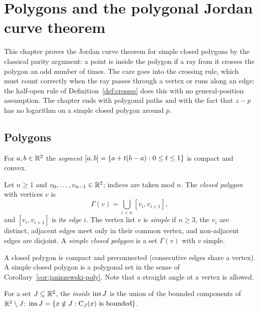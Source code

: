 \chapter{Polygons and the polygonal Jordan curve theorem}\label{ch:poly}

This chapter proves the Jordan curve theorem for simple closed polygons by the classical parity
argument: a point is inside the polygon if a ray from it crosses the polygon an odd number of times.
The care goes into the crossing rule, which must count correctly when the ray passes through a
vertex or runs along an edge; the half-open rule of Definition~\ref{def:crosses} does this with no
general-position assumption. The chapter ends with polygonal paths and with the fact that $z-p$ has
no logarithm on a simple closed polygon around $p$.

\section{Polygons}

For $a,b\in\mathbb{R}^2$ the \emph{segment} $[a,b]=\left\{ a+t(b-a):0\le t\le1 \right\}$ is compact and convex.

\begin{definition}\label{def:polygon}
Let $n\ge1$ and $v_0,\dots,v_{n-1}\in\mathbb{R}^2$; indices are taken mod $n$. The \emph{closed polygon}
with vertices $v$ is
\[
\Gamma(v)=\bigcup_{i<n}[v_i,v_{i+1}],
\]
and $[v_i,v_{i+1}]$ is its \emph{edge} $i$. The vertex list $v$ is \emph{simple} if $n\ge3$, the
$v_i$ are distinct, adjacent edges meet only in their common vertex, and non-adjacent edges are
disjoint. A \emph{simple closed polygon} is a set $\Gamma(v)$ with $v$ simple.
\end{definition}


A closed polygon is compact and preconnected (consecutive edges share a vertex). A simple closed
polygon is a polygonal set in the sense of Corollary~\ref{cor:janiszewski-poly}. Note that a
straight angle at a vertex is allowed.

\begin{definition}\label{def:ins}
For a set $J\subseteq\mathbb{R}^2$, the \emph{inside} $\operatorname{ins} J$ is the union of the bounded components of
$\mathbb{R}^2\setminus J$:
$\operatorname{ins} J=\left\{ x\notin J:\operatorname{C}_{J}(x)\text{ is bounded} \right\}$.
\end{definition}

